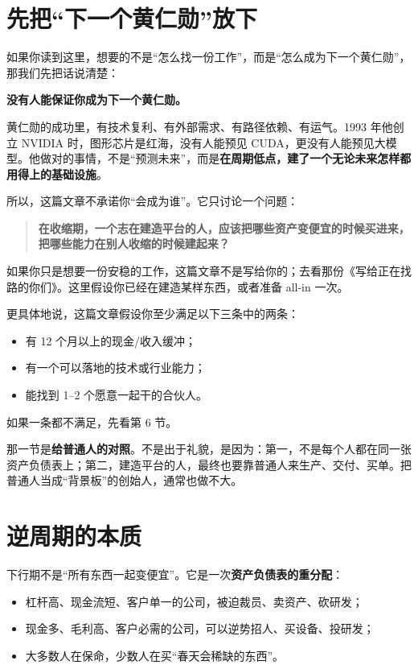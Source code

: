 \chapter{先把``下一个黄仁勋''放下}\label{ux5148ux628aux4e0bux4e00ux4e2aux9ec4ux4ec1ux52cbux653eux4e0b}

如果你读到这里，想要的不是``怎么找一份工作''，而是``怎么成为下一个黄仁勋''，那我们先把话说清楚：

\textbf{没有人能保证你成为下一个黄仁勋。}

黄仁勋的成功里，有技术复利、有外部需求、有路径依赖、有运气。1993
年他创立 NVIDIA 时，图形芯片是红海，没有人能预见
CUDA，更没有人能预见大模型。他做对的事情，不是``预测未来''，而是\textbf{在周期低点，建了一个无论未来怎样都用得上的基础设施}。

所以，这篇文章不承诺你``会成为谁''。它只讨论一个问题：

\begin{quote}
\textbf{在收缩期，一个志在建造平台的人，应该把哪些资产变便宜的时候买进来，把哪些能力在别人收缩的时候建起来？}
\end{quote}

如果你只是想要一份安稳的工作，这篇文章不是写给你的；去看那份《写给正在找路的你们》。这里假设你已经在建造某样东西，或者准备
all-in 一次。

更具体地说，这篇文章假设你至少满足以下三条中的两条：

\begin{itemize}
\tightlist
\item
  有 12 个月以上的现金/收入缓冲；
\item
  有一个可以落地的技术或行业能力；
\item
  能找到 1--2 个愿意一起干的合伙人。
\end{itemize}

如果一条都不满足，先看第 6 节。

那一节是\textbf{给普通人的对照}。不是出于礼貌，是因为：第一，不是每个人都在同一张资产负债表上；第二，建造平台的人，最终也要靠普通人来生产、交付、买单。把普通人当成``背景板''的创始人，通常也做不大。

\chapter{逆周期的本质}\label{ux9006ux5468ux671fux7684ux672cux8d28}

下行期不是``所有东西一起变便宜''。它是一次\textbf{资产负债表的重分配}：

\begin{itemize}
\tightlist
\item
  杠杆高、现金流短、客户单一的公司，被迫裁员、卖资产、砍研发；
\item
  现金多、毛利高、客户必需的公司，可以逆势招人、买设备、投研发；
\item
  大多数人在保命，少数人在买``春天会稀缺的东西''。
\end{itemize}

